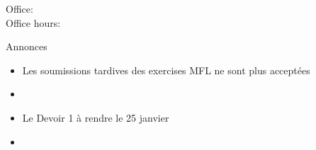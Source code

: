 \documentclass{beamer}
\subtitle[Meubles et objets indirects]{Les meubles et les pronoms compléments d'objet indirect}
\begin{document}
  \begin{frame}
    \titlepage
    \tiny{Office: \\
          Office hours: }
  \end{frame}

  \begin{frame}{Annonces}
    \begin{itemize}
      \item Les soumissions tardives des exercises MFL ne sont plus acceptées
      \item[] 
      \item Le Devoir 1 à rendre le 25 janvier
      \item[] 
    \end{itemize}
  \end{frame}
\end{document}
